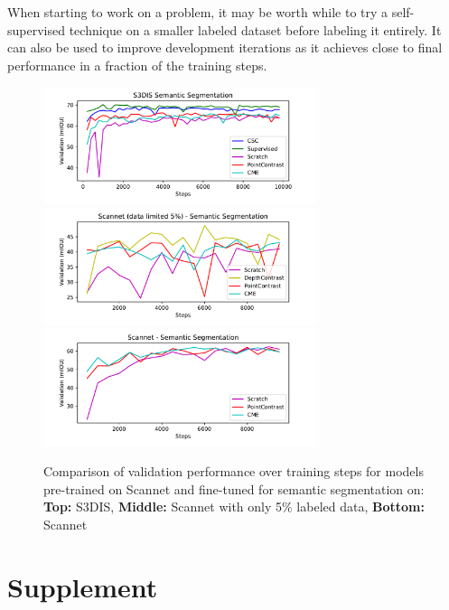 \documentclass[10pt,twocolumn,letterpaper]{article}
\begin{document}
When starting to work on a problem, it may be worth while to try a self-supervised technique on a smaller labeled dataset before labeling it entirely. It can also be used to improve development iterations as it achieves close to final performance in a fraction of the training steps.

\begin{figure}[h!]
    \centering
    \includegraphics[width=8cm]{images/plots/s3dis_semantic.pdf}
    \includegraphics[width=8cm]{images/plots/scannet_0.05_semantic.pdf}
    \includegraphics[width=8cm]{images/plots/scannet_semantic.pdf}
    \caption{Comparison of validation performance over training steps for models pre-trained on Scannet and fine-tuned for semantic segmentation on: \textbf{Top:} S3DIS, \textbf{Middle:} Scannet with only 5\% labeled data, \textbf{Bottom:} Scannet}
    \label{fig:validationComparison}
\end{figure}


\clearpage
{\small
    
    
}

\clearpage
\section{Supplement}
\end{document}
